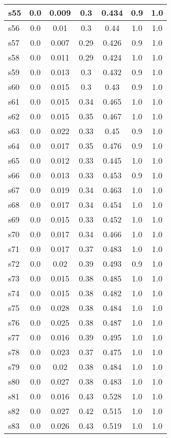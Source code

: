 \documentclass{article}
\begin{document}
\begin{tabular}{|l|c|c|c|c|c|c|}
s55 &0.0 & 0.009 & 0.3 & 0.434 & 0.9 & 1.0\\
\hline
s56 &0.0 & 0.01 & 0.3 & 0.44 & 1.0 & 1.0\\
\hline
s57 &0.0 & 0.007 & 0.29 & 0.426 & 0.9 & 1.0\\
\hline
s58 &0.0 & 0.011 & 0.29 & 0.424 & 1.0 & 1.0\\
\hline
s59 &0.0 & 0.013 & 0.3 & 0.432 & 0.9 & 1.0\\
\hline
s60 &0.0 & 0.015 & 0.3 & 0.43 & 0.9 & 1.0\\
\hline
s61 &0.0 & 0.015 & 0.34 & 0.465 & 1.0 & 1.0\\
\hline
s62 &0.0 & 0.015 & 0.35 & 0.467 & 1.0 & 1.0\\
\hline
s63 &0.0 & 0.022 & 0.33 & 0.45 & 0.9 & 1.0\\
\hline
s64 &0.0 & 0.017 & 0.35 & 0.476 & 0.9 & 1.0\\
\hline
s65 &0.0 & 0.012 & 0.33 & 0.445 & 1.0 & 1.0\\
\hline
s66 &0.0 & 0.013 & 0.33 & 0.453 & 0.9 & 1.0\\
\hline
s67 &0.0 & 0.019 & 0.34 & 0.463 & 1.0 & 1.0\\
\hline
s68 &0.0 & 0.017 & 0.34 & 0.454 & 1.0 & 1.0\\
\hline
s69 &0.0 & 0.015 & 0.33 & 0.452 & 1.0 & 1.0\\
\hline
s70 &0.0 & 0.017 & 0.34 & 0.466 & 1.0 & 1.0\\
\hline
s71 &0.0 & 0.017 & 0.37 & 0.483 & 1.0 & 1.0\\
\hline
s72 &0.0 & 0.02 & 0.39 & 0.493 & 0.9 & 1.0\\
\hline
s73 &0.0 & 0.015 & 0.38 & 0.485 & 1.0 & 1.0\\
\hline
s74 &0.0 & 0.015 & 0.38 & 0.482 & 1.0 & 1.0\\
\hline
s75 &0.0 & 0.028 & 0.38 & 0.484 & 1.0 & 1.0\\
\hline
s76 &0.0 & 0.025 & 0.38 & 0.487 & 1.0 & 1.0\\
\hline
s77 &0.0 & 0.016 & 0.39 & 0.495 & 1.0 & 1.0\\
\hline
s78 &0.0 & 0.023 & 0.37 & 0.475 & 1.0 & 1.0\\
\hline
s79 &0.0 & 0.02 & 0.38 & 0.484 & 1.0 & 1.0\\
\hline
s80 &0.0 & 0.027 & 0.38 & 0.483 & 1.0 & 1.0\\
\hline
s81 &0.0 & 0.016 & 0.43 & 0.528 & 1.0 & 1.0\\
\hline
s82 &0.0 & 0.027 & 0.42 & 0.515 & 1.0 & 1.0\\
\hline
s83 &0.0 & 0.026 & 0.43 & 0.519 & 1.0 & 1.0\\

\end{tabular}
\end{document}
